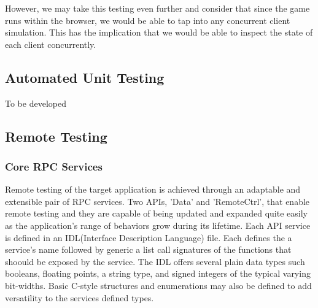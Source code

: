 \documentclass[conference]{IEEEtran}
\begin{document}
However, we may take this testing even further and consider that since the game runs within the browser, we would be able to tap into any concurrent client simulation. This
has the implication that we would be able to inspect the state of each client concurrently.

\subsection{Automated Unit Testing}

To be developed


\subsection{Remote Testing}

\subsubsection{Core RPC Services}Remote testing of the target application is achieved through an adaptable and extensible pair of RPC services. Two APIs, 'Data' and 'RemoteCtrl', that enable remote testing and they are capable of being updated and expanded quite easily as the application's range of behaviors grow during its lifetime. Each API service is defined in an IDL(Interface Description Language) file. Each defines the a service's name followed by generic a list call signatures of the functions that shoould be exposed by the service. The IDL offers several plain data types such booleans, floating points, a string type, and signed integers of the typical varying bit-widths. Basic C-style structures and enumerations may also be defined to add versatility to the services defined types.
\end{document}
